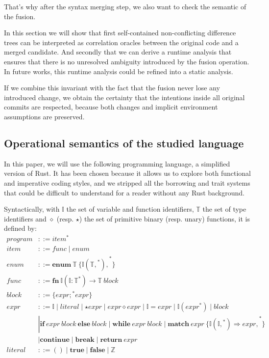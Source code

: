 \documentclass[a4paper,11pt]{article}
\newcommand\typsep{\mathrel{|}}
\begin{document}
That's why after the syntax merging step, we also want to check the semantic of the fusion.

In this section we will show that first self-contained non-conflicting difference trees can be interpreted as correlation oracles between the original code and a merged candidate. And secondly that we can derive a runtime analysis that ensures that there is no unresolved ambiguity introduced by the fusion operation. In future works, this runtime analysis could be refined into a static analysis.

If we combine this invariant with the fact that the fusion never lose any introduced change, we obtain the certainty that the intentions inside all original commits are respected, because both changes and implicit environment assumptions are preserved.

\subsection{Operational semantics of the studied language}
In this paper, we will use the following programming language, a simplified version of Rust. It has been chosen because it allows us to explore both functional and imperative coding styles, and we stripped all the borrowing and trait systems that could be difficult to understand for a reader without any Rust background.

\newcommand{\ident}{\mathbb{I}}
\newcommand{\typ}{\mathbb{T}}
Syntactically, with $\ident$ the set of variable and function identifiers, $\typ$ the set of type identifiers and $\diamond$ (resp. $\star$) the set of primitive binary (resp. unary) functions, it is defined by:
\begin{align*}
program &::= \boxed{item}^*\\
item &::= func \typsep enum\\
enum &::= \mathbf{enum}\ \typ\ \{ \boxed{\ident(\boxed{\typ,}^*),}^* \}\\
func &::= \mathbf{fn}\ \ident(\boxed{\ident: \typ}^*) \rightarrow \typ\ block\\
block &::= \{ \boxed{expr;}^* expr \}\\
expr &::= \ident \typsep literal \typsep \star expr \typsep expr \diamond expr \typsep \ident = expr \typsep \ident(\boxed{expr}^*) \typsep block\\
&\typsep \mathbf{if}\ expr\ block\ \mathbf{else}\ block \typsep \mathbf{while}\ expr\ block \typsep \mathbf{match}\ expr\ \{ \boxed{\ident(\boxed{\ident,}^*) \Rightarrow expr,}^* \}\\
&\typsep \mathbf{continue} \typsep \mathbf{break} \typsep \textbf{return}\ expr\\
literal &::= () \typsep \mathbf{true} \typsep \mathbf {false} \typsep \mathbb{Z}
\end{align*}
\end{document}
